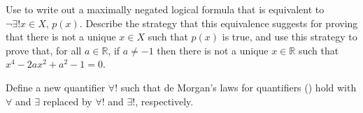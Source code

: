 \begin{chapex}
Use  to write out a maximally negated logical formula that is equivalent to $\neg \exists! x \in X,\, p(x)$. Describe the strategy that this equivalence suggests for proving that there is not a unique $x \in X$ such that $p(x)$ is true, and use this strategy to prove that, for all $a \in \mathbb{R}$, if $a \ne -1$ then there is not a unique $x \in \mathbb{R}$ such that $x^4-2ax^2+a^2-1=0$.
\end{chapex}

\begin{chapex}
Define a new quantifier $\forall !$ such that de Morgan's laws for quantifiers () hold with $\forall$ and $\exists$ replaced by $\forall !$ and $\exists !$, respectively.
\end{chapex}